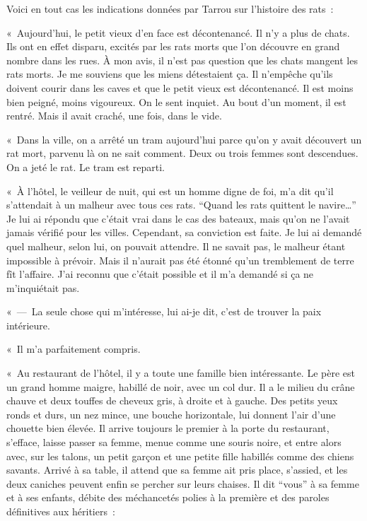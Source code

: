 \documentclass[french,twoside]{book} %
\begin{document}
Voici en tout cas les indications données par Tarrou sur l’histoire des rats :\par
« Aujourd’hui, le petit vieux d’en face est décontenancé. Il n’y a plus de chats. Ils ont en effet disparu, excités par les rats morts que l’on découvre en grand nombre dans les rues. À mon avis, il n’est pas question que les chats mangent les rats morts. Je me souviens que les miens détestaient ça. Il n’empêche qu’ils doivent courir dans les caves et que le petit vieux est décontenancé. Il est moins bien peigné, moins vigoureux. On le sent inquiet. Au bout d’un moment, il est rentré. Mais il avait craché, une fois, dans le vide.\par
« Dans la ville, on a arrêté un tram aujourd’hui parce qu’on y avait découvert un rat mort, parvenu là on ne sait comment. Deux ou trois femmes sont descendues. On a jeté le rat. Le tram est reparti.\par
« À l’hôtel, le veilleur de nuit, qui est un homme digne de foi, m’a dit qu’il s’attendait à un malheur avec tous ces rats. “Quand les rats quittent le navire…” Je lui ai répondu que c’était vrai dans le cas des bateaux, mais qu’on ne l’avait jamais vérifié pour les villes. Cependant, sa conviction est faite. Je lui ai demandé quel malheur, selon lui, on pouvait attendre. Il ne savait pas, le malheur étant impossible à prévoir. Mais il n’aurait pas été étonné qu’un tremblement de terre fît l’affaire. J’ai reconnu que c’était possible et il m’a demandé si ça ne m’inquiétait pas.\par
« — La seule chose qui m’intéresse, lui ai-je dit, c’est de trouver la paix intérieure.\par
« Il m’a parfaitement compris.\par
« Au restaurant de l’hôtel, il y a toute une famille bien intéressante. Le père est un grand homme maigre, habillé de noir, avec un col dur. Il a le milieu du crâne chauve et deux touffes de cheveux gris, à droite et à gauche. Des petits yeux ronds et durs, un nez mince, une bouche horizontale, lui donnent l’air d’une chouette bien élevée. Il arrive toujours le premier à la porte du restaurant, s’efface, laisse passer sa femme, menue comme une souris noire, et entre alors avec, sur les talons, un petit garçon et une petite fille habillés comme des chiens savants. Arrivé à sa table, il attend que sa femme ait pris place, s’assied, et les deux caniches peuvent enfin se percher sur leurs chaises. Il dit “vous” à sa femme et à ses enfants, débite des méchancetés polies à la première et des paroles définitives aux héritiers :\par
\end{document}
